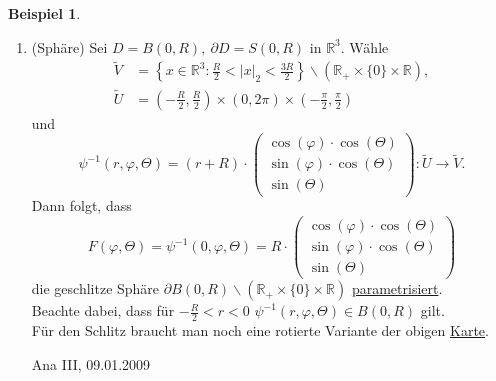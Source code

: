 \documentclass[a4paper]{scrreprt}
\newcommand{\R}{\mathbb{R}}
\newcommand{\jlabel}[1]{\label{j_#1}}
\newcommand{\jhyperref}[2]{\hyperref[j_#1]{#2}}
\newcommand{\jlink}[1]{\jhyperref{#1}{#1}}
\newcommand{\jspacesmall}{\vspace{4pt}}
\newcommand{\jdate}[1]{\jspacesmall\begin{center}\jlabel{#1}\tiny{Ana III, #1}\end{center}}
\theoremstyle{plain}
\theoremstyle{definition}
\newtheorem{expl}[thm]{Beispiel}
\begin{document}
{{{{\jlabel{Bsp 4.3}
\begin{expl}
    \begin{enumerate}
        \item (Sphäre) Sei $D=B(0,R),\ \partial D=S(0,R)$ in $\R^3$. Wähle 
        \[
            \begin{split}
                \tilde{V} &= \left\{x \in \R^3 : \frac{R}{2} < |x|_2 < \frac{3R}{2} \right\} \backslash (\R_+ \times \{0\} \times \R),\\
                \tilde{U} &= \left(-\frac{R}{2}, \frac{R}{2} \right) \times (0,2\pi) \times \left(-\frac{\pi}{2}, \frac{\pi}{2} \right)
            \end{split}
        \]
        und
        \[
            \psi^{-1}(r,\varphi, \Theta) = (r+R)\cdot \begin{pmatrix}
                                                          \cos(\varphi)\cdot \cos(\Theta)\\
                                                          \sin(\varphi)\cdot \cos(\Theta)\\
                                                          \sin(\Theta)
                                                      \end{pmatrix} : \tilde{U} \rightarrow \tilde{V}.
        \]
        Dann folgt, dass
        \[
            F(\varphi, \Theta) = \psi^{-1}(0, \varphi, \Theta) = R\cdot \begin{pmatrix}
                                                                            \cos(\varphi)\cdot \cos(\Theta)\\
                                                                            \sin(\varphi)\cdot \cos(\Theta)\\
                                                                            \sin(\Theta)
                                                                        \end{pmatrix}
        \]
        die geschlitze Sphäre $\partial B(0,R)\backslash (\R_+ \times \{0\} \times \R)$ \jhyperref{Parametrisierung}{parametrisiert}.\\
        Beachte dabei, dass für $-\frac{R}{2} < r < 0$ $\psi^{-1}(r,\varphi, \Theta) \in B(0,R)$ gilt.\\
        Für den Schlitz braucht man noch eine rotierte Variante der obigen \jlink{Karte}.
        
        
\jdate{09.01.2009}
        

\end{enumerate}
\end{expl}}}}}
\end{document}
